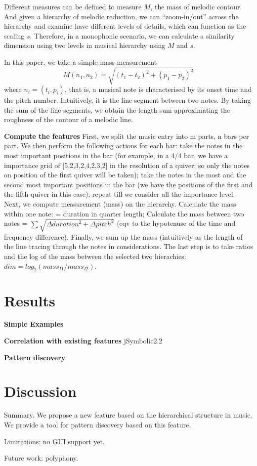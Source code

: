 \documentclass{article}
\begin{document}
Different measures can be defined to measure $M$, the mass of melodic contour.
And given a hierarchy of melodic reduction, we can ``zoom-in/out'' across the hierarchy and examine have different levels of details, which can function as the scaling $s$.
Therefore, in a monophonic scenario, we can calculate a similarity dimension using two levels in musical hierarchy using $M$ and $s$. 

In this paper, we take a simple mass measurement
$$M(n_1, n_2) = \sqrt{(t_1-t_2)^2 +(p_1-p_2)^2}$$
  where $n_i=(t_i, p_i)$, that is, a musical note is characterised by its onset time and the pitch number. 
Intuitively, it is the line segment between two notes.
By taking the sum of the line segments, we obtain the length sum approximating the roughness of the contour of a melodic line.

\textbf{Compute the features}
First, we split the music entry into m parts, n bars per part.
We then perform the following actions for each bar: take the notes in the most important positions in the bar (for example, in a 4/4 bar, we have a importance grid of [5,2,3,2,4,2,3,2] in the resolution of a quiver; so only the notes on position of the first quiver will be taken); take the notes in the most and the second most important positions in the bar (we have the positions of the first and the fifth quiver in this case); repeat till we consider all the importance level. Next, we compute measurement (mass) on the hierarchy. Calculate the mass within one note: = duration in quarter length; Calculate the mass between two notes =  $\sum \sqrt{\Delta duration^2 + \Delta pitch^2}$ (eqv to the hypotenuse of the time and frequency difference). Finally, we sum up the mass (intuitively as the length of the line tracing through the notes in considerations. The last step is to take ratios and the log of the mass between the selected two hierachies: $dim = log_2(mass_{I1}/mass_{I2})$.


\section{Results}

\textbf{Simple Examples}

\textbf{Correlation with existing features} jSymbolic2.2

\textbf{Pattern discovery}

\section{Discussion}
 
Summary. We propose a new feature based on the hierarchical structure in music. We provide a tool for pattern discovery based on this feature.

Limitations: no GUI support yet. 

Future work: polyphony. 


\end{document}
